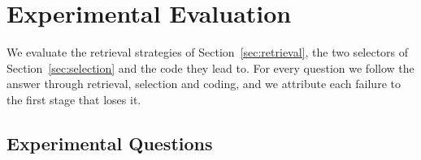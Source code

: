 %

\section{Experimental Evaluation}
\label{sec:evaluation}

We evaluate the retrieval strategies of Section~\ref{sec:retrieval}, the two
selectors of Section~\ref{sec:selection} and the code they lead to. For every
question we follow the answer through retrieval, selection and coding, and we
attribute each failure to the first stage that loses it.

\subsection{Experimental Questions}
\label{sec:rq}

